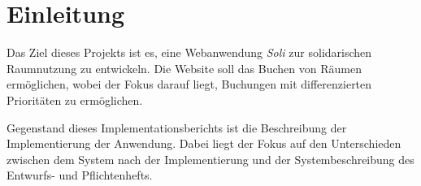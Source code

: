 
\chapter{Einleitung}
\label{ch:preface}


Das Ziel dieses Projekts ist es, eine Webanwendung \textit{Soli} zur solidarischen Raumnutzung zu entwickeln.
Die Website soll das Buchen von Räumen ermöglichen, wobei der Fokus darauf liegt, Buchungen mit differenzierten
Prioritäten zu ermöglichen.

Gegenstand dieses Implementationsberichts ist die Beschreibung der Implementierung der Anwendung.
Dabei liegt der Fokus auf den Unterschieden zwischen dem System nach der Implementierung und der Systembeschreibung des Entwurfs- und Pflichtenhefts.